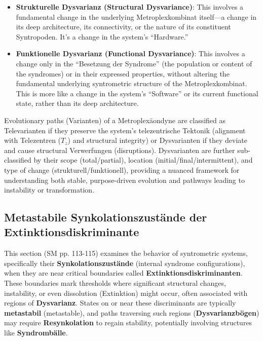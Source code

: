 \documentclass[12pt]{article}
\newcommand{\q}[1]{\enquote{#1}}
\newcommand{\telezentrum}{T_z}
\begin{document}
\begin{itemize}
\begin{enumerate}
\begin{itemize}
            \item \textbf{Strukturelle Dysvarianz (Structural Dysvariance)}: This involves a fundamental change in the underlying Metroplexkombinat itself—a change in its deep architecture, its connectivity, or the nature of its constituent Syntropoden. It's a change in the system's \q{Hardware.}
            \item \textbf{Funktionelle Dysvarianz (Functional Dysvariance)}: This involves a change only in the \q{Besetzung der Syndrome} (the population or content of the syndromes) or in their expressed properties, without altering the fundamental underlying syntrometric structure of the Metroplexkombinat. This is more like a change in the system's \q{Software} or its current functional state, rather than its deep architecture.
        \end{itemize}
    \end{enumerate}
\end{itemize}

Evolutionary paths (Varianten) of a Metroplexäondyne are classified as Televarianten if they preserve the system's telezentrische Tektonik (alignment with Telezentren (\(\telezentrum\)) and structural integrity) or Dysvarianten if they deviate and cause structural Verwerfungen (disruptions). Dysvarianten are further sub-classified by their scope (total/partial), location (initial/final/intermittent), and type of change (strukturell/funktionell), providing a nuanced framework for understanding both stable, purpose-driven evolution and pathways leading to instability or transformation.

\subsection{Metastabile Synkolationszustände der Extinktionsdiskriminante}
\label{sec:metastabilitaet}

This section (SM pp. 113-115) examines the behavior of syntrometric systems, specifically their \textbf{Synkolationszustände} (internal syndrome configurations), when they are near critical boundaries called \textbf{Extinktionsdiskriminanten}. These boundaries mark thresholds where significant structural changes, instability, or even dissolution (Extinktion) might occur, often associated with regions of \textbf{Dysvarianz}. States on or near these discriminants are typically \textbf{metastabil} (metastable), and paths traversing such regions (\textbf{Dysvarianzbögen}) may require \textbf{Resynkolation} to regain stability, potentially involving structures like \textbf{Syndrombälle}.
\end{document}

